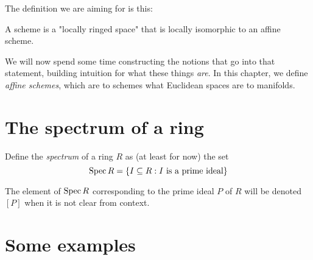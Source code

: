 \medskip\noindent The definition we are aiming for is this:

\begin{adefinition}[Target]
  A scheme is a "locally ringed space" that is locally isomorphic to an affine
  scheme.
\end{adefinition}

We will now spend some time constructing the notions that go into that
statement, building intuition for what these things \emph{are}. In this chapter,
we define \emph{affine schemes}, which are to schemes what Euclidean spaces are
to manifolds.

\section{The spectrum of a ring}
\label{sec:the-spectrum-of-a-ring}

\begin{adefinition}[Provisional]
 Define the \emph{spectrum} of a ring $R$ as (at least for now) the set
\[ \operatorname{Spec} R = \{ I \subseteq R : I \text{ is a prime ideal} \} \]
\end{adefinition}

The element of $\operatorname{Spec} R$ corresponding to the prime ideal $P$ of $R$ will be
denoted $[P]$ when it is not clear from context.

\section{Some examples}
\label{sec:examples-of-affine-schemes}
